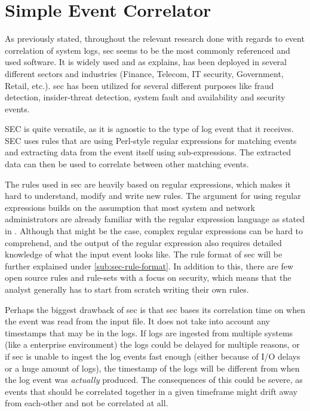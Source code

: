 \section{Simple Event Correlator}
\label{sec:SEC}

As previously stated, throughout the relevant research done with regards to event correlation of system logs, \acrshort{sec} seems to be the most commonly referenced and used software. It is widely used and as \textcite{vaarandi2005tools} explains, has been deployed in several different sectors and industries (Finance, Telecom, IT security, Government, Retail, etc.). \acrshort{sec} has been utilized for several different purposes like fraud detection, insider-threat detection, system fault and availability and security events.

SEC is quite versatile, as it is agnostic to the type of log event that it receives. SEC uses rules that are using Perl-style regular expressions for matching events and extracting data from the event itself using sub-expressions. The extracted data can then be used to correlate between other matching events.

The rules used in \acrshort{sec} are heavily based on regular expressions, which makes it hard to understand, modify and write new rules. The argument for using regular expressions builds on the assumption that most system and network administrators are already familiar with the regular expression language as stated in \textcite{vaarandi2002sec}. Although that might be the case, complex regular expressions can be hard to comprehend, and the output of the regular expression also requires detailed knowledge of what the input event looks like. The rule format of \acrshort{sec} will be further explained under \cref{sub:sec-rule-format}.
In addition to this, there are few open source rules and rule-sets with a focus on security, which means that the analyst generally has to start from scratch writing their own rules.

Perhaps the biggest drawback of \acrshort{sec} is that \acrshort{sec} bases its correlation time on when the event was read from the input file. It does not take into account any timestamps that may be in the logs.
If logs are ingested from multiple systems (like a enterprise environment) the logs could be delayed for multiple reasons, or if \acrshort{sec} is unable to ingest the log events fast enough (either because of I/O delays or a huge amount of logs), the timestamp of the logs will be different from when the log event was \textit{actually} produced. The consequences of this could be severe, as events that should be correlated together in a given timeframe might drift away from each-other and not be correlated at all.

